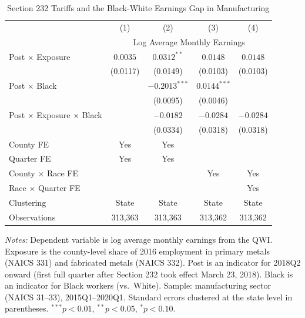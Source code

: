 \begin{table}
\begin{threeparttable}[htbp]
\centering
\caption{Section 232 Tariffs and the Black-White Earnings Gap in Manufacturing}
\label{tab:main}
\begin{tabular}{lcccc}
\toprule
 & (1) & (2) & (3) & (4) \\
 & \multicolumn{4}{c}{Log Average Monthly Earnings} \\
\midrule
Post $\times$ Exposure & $0.0035$ & $0.0312^{**}$ & $0.0148$ & $0.0148$ \\
 & (0.0117) & (0.0149) & (0.0103) & (0.0103) \\[6pt]
Post $\times$ Black & & $-0.2013^{***}$ & $0.0144^{***}$ & \\
 & & (0.0095) & (0.0046) & \\[6pt]
Post $\times$ Exposure $\times$ Black & & $-0.0182$ & $-0.0284$ & $-0.0284$ \\
 & & (0.0334) & (0.0318) & (0.0318) \\
\midrule
County FE & Yes & Yes & & \\
Quarter FE & Yes & Yes & & \\
County $\times$ Race FE & & & Yes & Yes \\
Race $\times$ Quarter FE & & & & Yes \\
Clustering & State & State & State & State \\
Observations & 313,363 & 313,363 & 313,362 & 313,362 \\
\bottomrule
\end{tabular}
\begin{tablenotes}
\small
\item \textit{Notes:} Dependent variable is log average monthly earnings from the QWI. Exposure is the county-level share of 2016 employment in primary metals (NAICS 331) and fabricated metals (NAICS 332). Post is an indicator for 2018Q2 onward (first full quarter after Section 232 took effect March 23, 2018). Black is an indicator for Black workers (vs.\ White). Sample: manufacturing sector (NAICS 31--33), 2015Q1--2020Q1. Standard errors clustered at the state level in parentheses. $^{***}p<0.01$, $^{**}p<0.05$, $^{*}p<0.10$.
\end{tablenotes}
\end{threeparttable}
\end{table}
